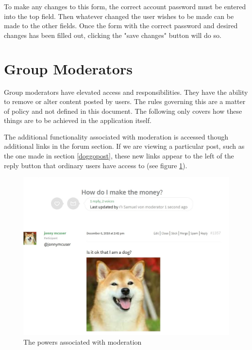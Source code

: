 \documentclass[10pt]{article}
\begin{document}
\begin{flushleft}
To make any changes to this form, the correct account password must be entered into the top field.  Then whatever changed the user wishes to be made can be made to the other fields.  Once the form with the correct password and desired changes has been filled out, clicking the "save changes" button will do so. 
\end{flushleft}



\section{Group Moderators} \label{Moderators}

\begin{flushleft}
Group moderators have elevated access and responsibilities.  They have the ability to remove or alter content posted by users.  The rules governing this are a matter of policy and not defined in this document.  The following only covers how these things are to be achieved in the application itself. 
\end{flushleft}

\begin{flushleft}
The additional functionality associated with moderation is accessed though additional links in the forum section.  If we are viewing a particular post, such as the one made in section \ref{doggopost}, these new links appear to the left of the reply button that ordinary users have access to (see figure \ref{modpowers}).  
\end{flushleft}

\begin{figure}[H]
    \centering
    \includegraphics[scale=0.5]{images/moderatorpostview.jpg}
    \caption{The powers associated with moderation}
    \label{modpowers}
\end{figure}
\end{document}
